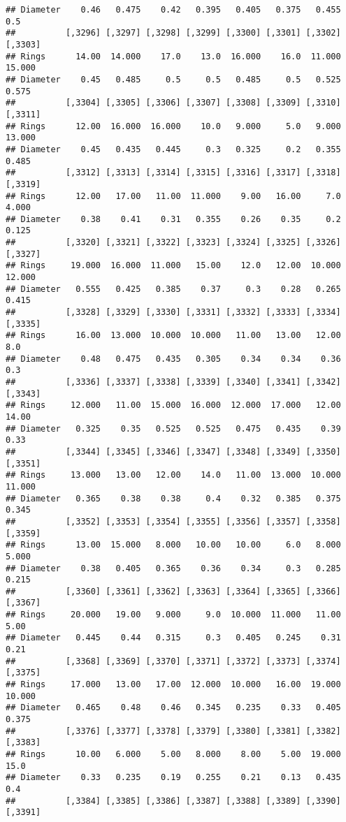 \documentclass[
]{article}
\begin{document}
\begin{verbatim}
## Diameter    0.46   0.475    0.42   0.395   0.405   0.375   0.455     0.5
##          [,3296] [,3297] [,3298] [,3299] [,3300] [,3301] [,3302] [,3303]
## Rings      14.00  14.000    17.0    13.0  16.000    16.0  11.000  15.000
## Diameter    0.45   0.485     0.5     0.5   0.485     0.5   0.525   0.575
##          [,3304] [,3305] [,3306] [,3307] [,3308] [,3309] [,3310] [,3311]
## Rings      12.00  16.000  16.000    10.0   9.000     5.0   9.000  13.000
## Diameter    0.45   0.435   0.445     0.3   0.325     0.2   0.355   0.485
##          [,3312] [,3313] [,3314] [,3315] [,3316] [,3317] [,3318] [,3319]
## Rings      12.00   17.00   11.00  11.000    9.00   16.00     7.0   4.000
## Diameter    0.38    0.41    0.31   0.355    0.26    0.35     0.2   0.125
##          [,3320] [,3321] [,3322] [,3323] [,3324] [,3325] [,3326] [,3327]
## Rings     19.000  16.000  11.000   15.00    12.0   12.00  10.000  12.000
## Diameter   0.555   0.425   0.385    0.37     0.3    0.28   0.265   0.415
##          [,3328] [,3329] [,3330] [,3331] [,3332] [,3333] [,3334] [,3335]
## Rings      16.00  13.000  10.000  10.000   11.00   13.00   12.00     8.0
## Diameter    0.48   0.475   0.435   0.305    0.34    0.34    0.36     0.3
##          [,3336] [,3337] [,3338] [,3339] [,3340] [,3341] [,3342] [,3343]
## Rings     12.000   11.00  15.000  16.000  12.000  17.000   12.00   14.00
## Diameter   0.325    0.35   0.525   0.525   0.475   0.435    0.39    0.33
##          [,3344] [,3345] [,3346] [,3347] [,3348] [,3349] [,3350] [,3351]
## Rings     13.000   13.00   12.00    14.0   11.00  13.000  10.000  11.000
## Diameter   0.365    0.38    0.38     0.4    0.32   0.385   0.375   0.345
##          [,3352] [,3353] [,3354] [,3355] [,3356] [,3357] [,3358] [,3359]
## Rings      13.00  15.000   8.000   10.00   10.00     6.0   8.000   5.000
## Diameter    0.38   0.405   0.365    0.36    0.34     0.3   0.285   0.215
##          [,3360] [,3361] [,3362] [,3363] [,3364] [,3365] [,3366] [,3367]
## Rings     20.000   19.00   9.000     9.0  10.000  11.000   11.00    5.00
## Diameter   0.445    0.44   0.315     0.3   0.405   0.245    0.31    0.21
##          [,3368] [,3369] [,3370] [,3371] [,3372] [,3373] [,3374] [,3375]
## Rings     17.000   13.00   17.00  12.000  10.000   16.00  19.000  10.000
## Diameter   0.465    0.48    0.46   0.345   0.235    0.33   0.405   0.375
##          [,3376] [,3377] [,3378] [,3379] [,3380] [,3381] [,3382] [,3383]
## Rings      10.00   6.000    5.00   8.000    8.00    5.00  19.000    15.0
## Diameter    0.33   0.235    0.19   0.255    0.21    0.13   0.435     0.4
##          [,3384] [,3385] [,3386] [,3387] [,3388] [,3389] [,3390] [,3391]

\end{verbatim}
\end{document}
